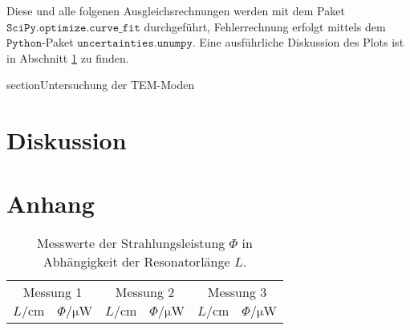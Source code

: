 \FloatBarrier

Diese und alle folgenen Ausgleichsrechnungen werden mit dem Paket $\texttt{SciPy.optimize.curve\_fit}$ durchgeführt, Fehlerrechnung erfolgt mittels dem $\texttt{Python}$-Paket $\texttt{uncertainties.unumpy}$.
Eine ausführliche Diskussion des Plots ist in Abschnitt \ref{sec: Diskussion} zu finden.

section{Untersuchung der TEM-Moden}




\section{Diskussion} \label{sec: Diskussion}

\appendix 
\section*{Anhang}\label{sec:Anhang}

\FloatBarrier
\begin{table}[h]
    \centering
    \caption{Messwerte der Strahlungsleistung $\Phi$ in Abhängigkeit der Resonatorlänge $L$.}
    \label{tab:atab1}
    \begin{tabular}{c c c c c c}
        \toprule
        \multicolumn{2}{c}{Messung 1} & \multicolumn{2}{c}{Messung 2} & \multicolumn{2}{c}{Messung 3} \\
        \cmidrule(lr){1-2}\cmidrule(lr){3-4}\cmidrule(lr){5-6}
        {$L/\si{\cm}$} & {$\Phi/\si{\micro\W}$} & {$L/\si{\cm}$} & {$\Phi/\si{\micro\W}$} & {$L/\si{\cm}$} & {$\Phi/\si{\micro\W}$} \\
        \midrule


        \bottomrule
    \end{tabular}
\end{table}
\FloatBarrier
\noindent


\nocite{wingate}
\nocite{*}
\printbibliography

